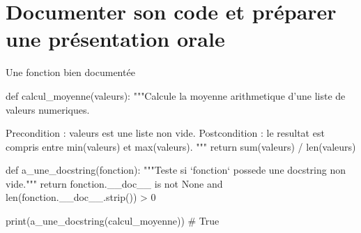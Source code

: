 \section{Documenter son code et préparer une présentation orale}


\begin{codereference}{Une fonction bien documentée}
\begin{python}
def calcul_moyenne(valeurs):
    """Calcule la moyenne arithmetique d'une liste de valeurs numeriques.

    Precondition : valeurs est une liste non vide.
    Postcondition : le resultat est compris entre min(valeurs) et max(valeurs).
    """
    return sum(valeurs) / len(valeurs)

def a_une_docstring(fonction):
    """Teste si `fonction` possede une docstring non vide."""
    return fonction.__doc__ is not None and len(fonction.__doc__.strip()) > 0

print(a_une_docstring(calcul_moyenne))  # True
\end{python}
\end{codereference}



